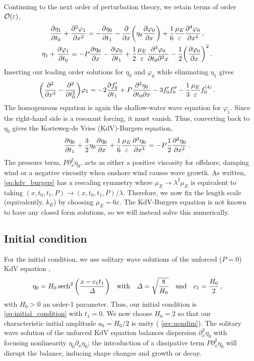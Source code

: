 \documentclass{jfm}
\renewcommand*{\epsilon}{\varepsilon}
\begin{document}
Continuing to the next order of perturbation theory, we retain terms of
order $\order{\epsilon}$,
\begin{gather}
    \pdv{\eta_1}{t_0} + \pdv[2]{\varphi_{1}}{x} =
      -\pdv{\eta_0}{t_1} - \pdv{x} \pqty{\eta_0 \pdv{\varphi_0}{x}} +
      \frac{1}{6} \frac{\mu_E}{\epsilon} \pdv[4]{\varphi_0}{x} \,,
  \\
    \eta_1 + \pdv{\varphi_1}{t_0} = -P \pdv{\eta_0}{x} -\pdv{\varphi_0}{t_1}
      + \frac{1}{2} \frac{\mu_E}{\epsilon} \frac{\partial^3 \varphi_0}
        {\partial t_0 \partial^2 x}
      - \frac{1}{2} \pqty{ \pdv{\varphi_0}{x} }^2
  \,.
\end{gather}
Inserting our leading order solutions for $\eta_0$ and $\varphi_0$ while
eliminating $\eta_1$ gives
\begin{equation}
  \pqty{\pdv[2]{x} - \pdv[2]{t_0}} \varphi_1 = -2 \pdv{f_0'}{t_1} +
    P\pdv{\eta_0}{t_0}{x} - 3 f_0' f_0'' - \frac{1}{3} \frac{\mu_E}{\epsilon}
    f_0^{(4)} \,.
\end{equation}
The homogeneous equation is again the shallow-water wave equation for
$\varphi_1$.
Since the right-hand side is a resonant forcing, it must vanish.
Thus, converting back to $\eta_0$ gives the Korteweg-de Vries
(KdV)-Burgers equation,
\begin{equation}
  \pdv{\eta_0}{t_1} + \frac{3}{2}
    \eta_0 \pdv{\eta_0}{x} + \frac{1}{6} \frac{\mu_E}{\epsilon}
    \pdv[3]{\eta_0}{x} = -P \frac{1}{2} \pdv[2]{\eta_0}{x} \,.
  \label{eq:kdv_burgers}
\end{equation}
The pressure term, $P \partial^2_x \eta_0$, acts as either a positive
viscosity for offshore, damping wind or a negative viscosity when
onshore wind causes wave growth.
As written, \cref{eq:kdv_burgers} has a rescaling symmetry where $\mu_E
\to \lambda^2 \mu_E$ is equivalent to taking $(x,t_0,t_1,P) \to
(x,t_0,t_1,P)/\lambda$.
Therefore, we now fix the length scale (equivalently, $k_E$) by choosing
$\mu_E = 6 \epsilon$.
The KdV-Burgers equation is not known to have any closed form solutions,
so we will instead solve this numerically.

\subsection{\label{sec:initial} Initial condition}
For the initial condition, we use solitary wave solutions of the unforced
($P=0$) KdV equation \citep[\eg][]{mei2005nonlinear},
\begin{equation}
  \eta_0 = H_0 \sech^2\pqty{\frac{x - c_1 t_1}{\Delta}}
  \qq{with}
  \Delta = \sqrt{\frac{8}{H_0}}
  \qq{and}
  c_1 = \frac{H_0}{2} \,,
  \label{eq:initial_condition}
\end{equation}
with $H_0>0$ an order-1 parameter.
Thus, our initial condition is \cref{eq:initial_condition} with $t_1=0$.
We now choose $H_0 = 2$ so that our characteristic initial amplitude
$a_0 = H_0/2$ is unity (\cf{} \cref{sec:nondim}).
The solitary wave solution of the unforced KdV equation balances
dispersion $\partial_x^3 \eta_0$ with focusing nonlinearity $\eta_0
\partial_x \eta_0$; the introduction of a dissipative term $P
\partial_x^2 \eta_0$ will disrupt the balance, inducing shape changes
and growth or decay.
\end{document}
